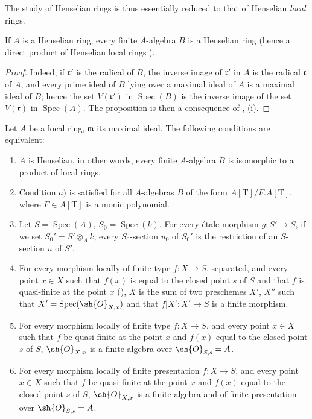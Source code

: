 The study of Henselian rings is thus essentially reduced to that of Henselian \emph{local} rings.

\begin{proposition}[18.5.10]
\label{IV.18.5.10}
If $A$ is a Henselian ring, every finite $A$-algebra $B$ is a Henselian ring (hence a direct product of Henselian local rings ).
\end{proposition}

\begin{proof}
Indeed, if $\mathfrak{r}'$ is the radical of $B$, the inverse image of $\mathfrak{r}'$ in $A$ is the radical $\mathfrak{r}$ of $A$, and every prime ideal of $B$ lying over a maximal ideal of $A$ is a maximal ideal of $B$;
hence the set $V(\mathfrak{r}')$ in $\operatorname{Spec}(B)$ is the inverse image of the set $V(\mathfrak{r})$ in $\operatorname{Spec}(A)$.
The proposition is then a consequence of , (i).
\end{proof}

\begin{theorem}[18.5.11]
\label{IV.18.5.11}
Let $A$ be a local ring, $\mathfrak{m}$ its maximal ideal.
The following conditions are equivalent:
\begin{enumerate}[label=\emph{\alph*)}]
  \item $A$ is Henselian, in other words, every finite $A$-algebra $B$ is isomorphic to a product of local rings.
  \item[a$'$)] Condition $a)$ is satisfied for all $A$-algebras $B$ of the form $A[\mathrm{T}]/F.A[\mathrm{T}]$, where $F\in A[\mathrm{T}]$ is a monic polynomial.
  \item Let $S=\operatorname{Spec}(A)$, $S_0=\operatorname{Spec}(k)$.
For every \'etale morphism $g:S'\to S$, if we set $S_0'=S'\otimes_A k$, every $S_0$-section $u_0$ of $S_0'$ is the restriction of an $S$-section $u$ of $S'$.
  \item For every morphism locally of finite type $f:X\to S$, separated, and every point $x\in X$ such that $f(x)$ is equal to the closed point $s$ of $S$ and that $f$ is quasi-finite at the point $x$ (), $X$ is the sum of two preschemes $X'$, $X''$ such that $X'=\operatorname{Spec}(\sh{O}_{X,x})$ and that $f|X':X'\to S$ is a finite morphism.
  \item[c$'$)] For every morphism locally of finite type $f:X\to S$, and every point $x\in X$ such that $f$ be quasi-finite at the point $x$ and $f(x)$ equal to the closed point $s$ of $S$, $\sh{O}_{X,x}$ is a finite algebra over $\sh{O}_{S,s}=A$.
  \item[c$''$)] For every morphism locally of finite presentation $f:X\to S$, and every point $x\in X$ such that $f$ be quasi-finite at the point $x$ and $f(x)$ equal to the closed point $s$ of $S$, $\sh{O}_{X,x}$ is a finite algebra and of finite presentation over $\sh{O}_{S,s}=A$.
\end{enumerate}
\end{theorem}

